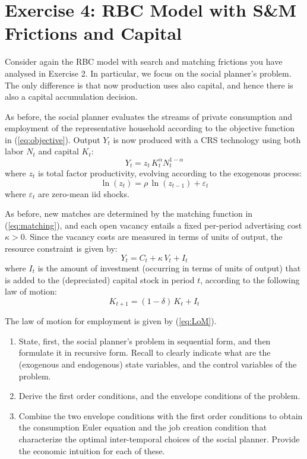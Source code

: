 \documentclass[a4paper,11pt]{article}
\begin{document}
\section*{Exercise 4: RBC Model with  S\&M Frictions and Capital}

Consider again the RBC model with search and matching frictions you have analysed in Exercise 2. In particular, we focus on the social planner’s problem. The only difference is that now production uses also capital, and hence there is also a capital accumulation decision.

\medskip

As before, the social planner evaluates the streams of private consumption and
employment of the representative household according to the objective function in (\ref{eq:objective}). Output $Y_t$ is now produced with a CRS technology using both labor $N_t$ and capital $K_t$:
$$ Y_t = z_t\,K_t^\alpha N_t^{1-\alpha} $$
where $z_t$ is total factor productivity, evolving according to the exogenous process:
$$ \ln(z_t) = \rho\,\ln(z_{t-1}) + \varepsilon_t $$
where $\varepsilon_t$ are zero-mean iid shocks.

\medskip

As before, new matches are determined by the matching function in (\ref{eq:matching}), and each open vacancy entails a fixed per-period advertising cost $\kappa > 0$. Since the vacancy costs are measured in terms of units of output, the resource constraint is given by:
$$ Y_t = C_t + \kappa\,V_t + I_t $$
where $I_t$ is the amount of investment (occurring in terms of units of output) that is added to the (depreciated) capital stock in period $t$, according to the following law of motion:
$$ K_{t+1} = (1-\delta)\,K_t + I_t $$

\medskip

The law of motion for employment is given by (\ref{eq:LoM}).

\begin{enumerate}
    \item State, first, the social planner's problem in sequential form, and then formulate it in recursive form. Recall to clearly indicate what are the (exogenous and endogenous) state variables, and the control variables of the problem.
    
    \item Derive the first order conditions, and the envelope conditions of the problem.
    
    \item Combine the two envelope conditions with the first order conditions to obtain the consumption Euler equation and the job creation condition that characterize the optimal inter-temporal choices of the social planner. Provide the economic intuition for each of these.
\end{enumerate}
\end{document}
